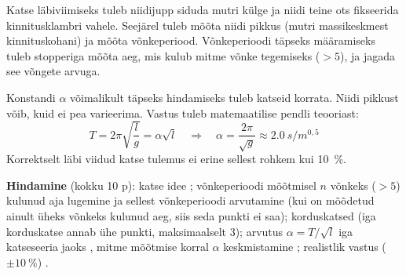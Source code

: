 %
Katse läbiviimiseks tuleb niidijupp siduda mutri külge ja niidi teine ots
fikseerida kinnitusklambri vahele. Seejärel tuleb mõõta niidi pikkus (mutri
massikeskmest kinnituskohani) ja mõõta võnkeperiood. Võnkeperioodi täpseks
määramiseks tuleb stopperiga mõõta aeg, mis kulub mitme võnke tegemiseks
($> 5$), ja jagada see võngete arvuga.

Konstandi $\alpha$ võimalikult täpseks hindamiseks tuleb katseid korrata.
Niidi pikkust võib, kuid ei pea varieerima. Vastus tuleb matemaatilise
pendli teooriast:
\[
T = 2\pi\sqrt{\frac{l}{g}} = \alpha\sqrt{l}
\quad\Rightarrow\quad
\alpha = \frac{2\pi}{\sqrt{g}} \approx \SI{2,0}{s/m^{0,5}}
\]
Korrektselt läbi viidud katse tulemus ei erine sellest rohkem kui
\SI{10}{\percent}.

\textbf{Hindamine} (kokku 10 p): katse idee ; võnkeperioodi mõõtmisel
$n$ võnkeks ($> 5$) kulunud aja lugemine ja sellest võnkeperioodi
arvutamine  (kui on mõõdetud ainult üheks võnkeks kulunud aeg, siis
seda punkti ei saa); korduskatsed  (iga korduskatse annab ühe
punkti, maksimaalselt 3); arvutus $\alpha = T/\sqrt{l}$ iga katseseeria
jaoks , mitme mõõtmise korral $\alpha$ keskmistamine
; realistlik vastus ($\pm\SI{10}{\percent}$) .
